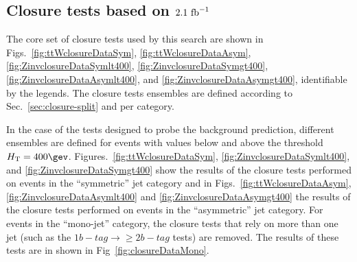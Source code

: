 
\subsection{Closure tests based on $2.1~\text{fb}^{-1}$}
\label{sec:closure-tests-data}

The core set of closure tests used by this search are shown in
Figs.~\ref{fig:ttWclosureDataSym}, \ref{fig:ttWclosureDataAsym},
\ref{fig:ZinvclosureDataSymlt400}, \ref{fig:ZinvclosureDataSymgt400},
\ref{fig:ZinvclosureDataAsymlt400}, and
\ref{fig:ZinvclosureDataAsymgt400}, identifiable by the legends. The
closure tests ensembles are defined according to
Sec.~\ref{sec:closure-split} and per \njet category. 

In the case of the tests designed to probe the \znunu background
prediction, different ensembles are defined for events with values
below and above the threshold $\scalht=400\gev$. 
Figures.~\ref{fig:ttWclosureDataSym},
\ref{fig:ZinvclosureDataSymlt400}, and
\ref{fig:ZinvclosureDataSymgt400} show the results of the closure
tests performed on events in the ``symmetric'' jet category and in
Figs.~\ref{fig:ttWclosureDataAsym}, \ref{fig:ZinvclosureDataAsymlt400}
and \ref{fig:ZinvclosureDataAsymgt400} the results of the closure
tests performed on events in the ``asymmetric'' jet category. For
events in the ``mono-jet'' category, the closure tests that rely on
more than one jet (such as the $1 b-tag\rightarrow\geq 2 b-tag$ tests)
are removed. The results of these tests are in shown in
Fig~\ref{fig:closureDataMono}.

